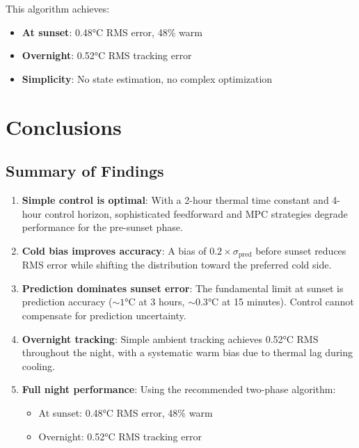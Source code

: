 \documentclass[11pt,letterpaper]{article}
\begin{document}
This algorithm achieves:
\begin{itemize}
    \item \textbf{At sunset}: 0.48°C RMS error, 48\% warm
    \item \textbf{Overnight}: 0.52°C RMS tracking error
    \item \textbf{Simplicity}: No state estimation, no complex optimization
\end{itemize}

\section{Conclusions}

\subsection{Summary of Findings}

\begin{enumerate}
    \item \textbf{Simple control is optimal}: With a 2-hour thermal time constant and 4-hour control horizon, sophisticated feedforward and MPC strategies degrade performance for the pre-sunset phase.

    \item \textbf{Cold bias improves accuracy}: A bias of $0.2 \times \sigma_{\text{pred}}$ before sunset reduces RMS error while shifting the distribution toward the preferred cold side.

    \item \textbf{Prediction dominates sunset error}: The fundamental limit at sunset is prediction accuracy ($\sim 1$°C at 3 hours, $\sim 0.3$°C at 15 minutes). Control cannot compensate for prediction uncertainty.

    \item \textbf{Overnight tracking}: Simple ambient tracking achieves 0.52°C RMS throughout the night, with a systematic warm bias due to thermal lag during cooling.

    \item \textbf{Full night performance}: Using the recommended two-phase algorithm:
    \begin{itemize}
        \item At sunset: 0.48°C RMS error, 48\% warm
        \item Overnight: 0.52°C RMS tracking error
    \end{itemize}
\end{enumerate}
\end{document}
